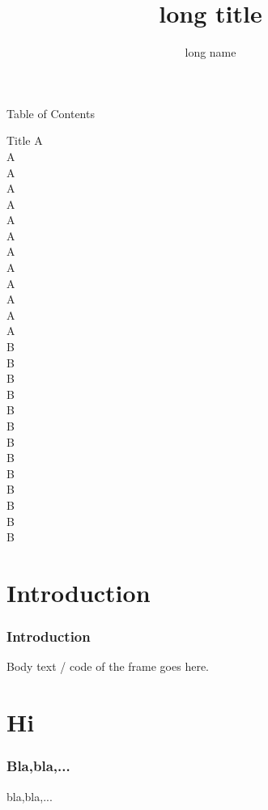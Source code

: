 \documentclass{beamer}
\title[short title]{long title}
\author[short name]{long name}
\begin{document}
\begin{frame}
\titlepage
\end{frame}

\begin{frame}{Table of Contents}
\tableofcontents%
\end{frame}

\begin{frame}[allowframebreaks]{Title}
A\\ A\\ A\\ A\\ A\\ A\\ A\\ A\\ A\\ A\\ A\\ A\\ A\\
\framebreak
B\\ B\\ B\\ B\\ B\\ B\\ B\\\framebreak B\\ B\\ B\\ B\\ B\\ B\\
\end{frame}

\section{Introduction}
\begin{frame}
\frametitle{Introduction}
Body text / code of the frame goes here.
\end{frame}

\section{Hi}
\begin{frame}
\frametitle{Bla,bla,...}
bla,bla,...
\end{frame}
\end{document}
